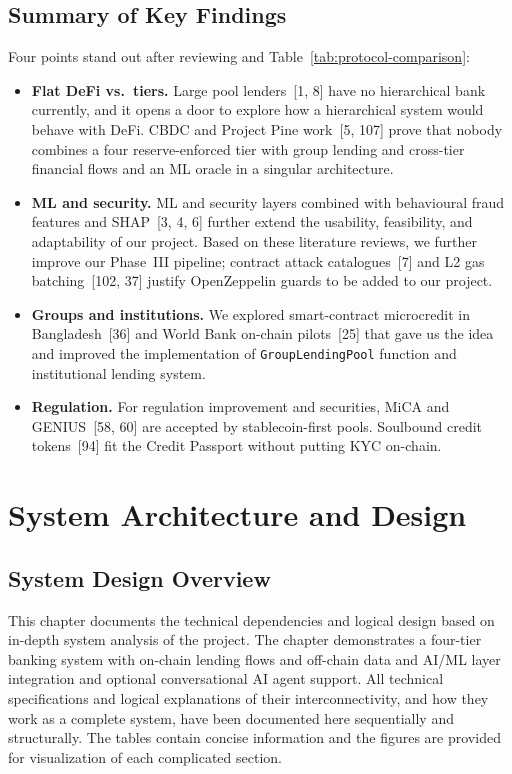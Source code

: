 \documentclass[12pt,a4paper]{report}
\begin{document}
\section{Summary of Key Findings}
\label{sec:lit-key-findings}

Four points stand out after reviewing and Table~\ref{tab:protocol-comparison}:

\begin{itemize}[noitemsep]
\item \textbf{Flat DeFi vs.\ tiers.} Large pool lenders~[1, 8] have no hierarchical bank currently, and it opens a door to explore how a hierarchical system would behave with DeFi. CBDC and Project Pine work~[5, 107] prove that nobody combines a four reserve-enforced tier with group lending and cross-tier financial flows and an ML oracle in a singular architecture.
\item \textbf{ML and security.} ML and security layers combined with behavioural fraud features and SHAP~[3, 4, 6] further extend the usability, feasibility, and adaptability of our project. Based on these literature reviews, we further improve our Phase~III pipeline; contract attack catalogues~[7] and L2 gas batching~[102, 37] justify OpenZeppelin guards to be added to our project.
\item \textbf{Groups and institutions.} We explored smart-contract microcredit in Bangladesh~[36] and World Bank on-chain pilots~[25] that gave us the idea and improved the implementation of \texttt{GroupLendingPool} function and institutional lending system.
\item \textbf{Regulation.} For regulation improvement and securities, MiCA and GENIUS~[58, 60] are accepted by stablecoin-first pools. Soulbound credit tokens~[94] fit the Credit Passport without putting KYC on-chain.
\end{itemize}

\chapter{System Architecture and Design}

\section{System Design Overview}
\label{sec:prototype-scope}

This chapter documents the technical dependencies and logical design based on in-depth system analysis of the project. The chapter demonstrates a four-tier banking system with on-chain lending flows and off-chain data and AI/ML layer integration and optional conversational AI agent support. All technical specifications and logical explanations of their interconnectivity, and how they work as a complete system, have been documented here sequentially and structurally. The tables contain concise information and the figures are provided for visualization of each complicated section.
\end{document}
